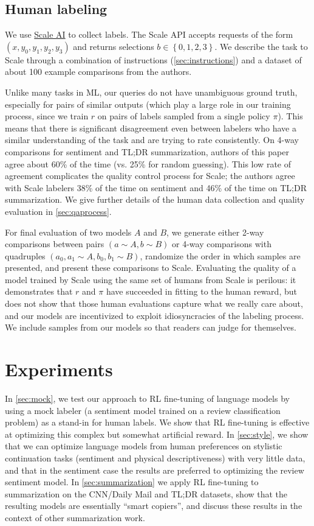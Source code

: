 \subsection{Human labeling}

We use \href{https://scale.com}{Scale AI} to collect labels. The Scale API accepts requests of the form $(x, y_0, y_1, y_2, y_3)$ and returns selections $b \in \left\{0, 1, 2, 3\right\}$.
We describe the task to Scale through a combination of instructions (\ref{sec:instructions})
and a dataset of about 100 example comparisons from the authors.

Unlike many tasks in ML, our queries do not have unambiguous ground truth, especially for pairs of similar outputs (which play a large role in our training process, since we train $r$ on pairs of labels sampled from a single policy $\pi$).
This means that there is significant disagreement even between labelers who have a similar understanding of the task and are trying to rate consistently. On 4-way comparisons for sentiment and TL;DR summarization, authors of this paper agree about 60\% of the time (vs. 25\% for random guessing). This low rate of agreement complicates the quality control process for Scale; the authors agree with Scale labelers 38\% of the time on sentiment and 46\% of the time on TL;DR summarization. We give further details of the human data collection and quality evaluation in \ref{sec:qaprocess}.

For final evaluation of two models $A$ and $B$, we generate either 2-way comparisons between pairs $(a \sim A, b \sim B)$ or 4-way comparisons with quadruples $(a_0, a_1 \sim A, b_0, b_1 \sim B)$, randomize the order in which samples are presented, and present these comparisons to Scale.  Evaluating the quality of a model trained by Scale using the same set of humans from Scale is perilous: it demonstrates that $r$ and $\pi$ have succeeded in fitting to the human reward, but does not show that those human evaluations capture what we really care about, and our models are incentivized to exploit idiosyncracies of the labeling process. We include samples from our models so that readers can judge for themselves.

\section{Experiments \label{sec:experiments}}

In \ref{sec:mock}, we test our approach to RL fine-tuning of language models by using a mock labeler (a sentiment model trained on a review classification problem) as a stand-in for human labels.  We show that RL fine-tuning is effective at optimizing this complex but somewhat artificial reward.  In \ref{sec:style}, we show that we can optimize language models from human preferences on stylistic continuation tasks (sentiment and physical descriptiveness) with very little data, and that in the sentiment case the results are preferred to optimizing the review sentiment model. In \ref{sec:summarization} we apply RL fine-tuning to summarization on the CNN/Daily Mail and TL;DR datasets, show that the resulting models are essentially ``smart copiers'', and discuss these results in the context of other summarization work.

